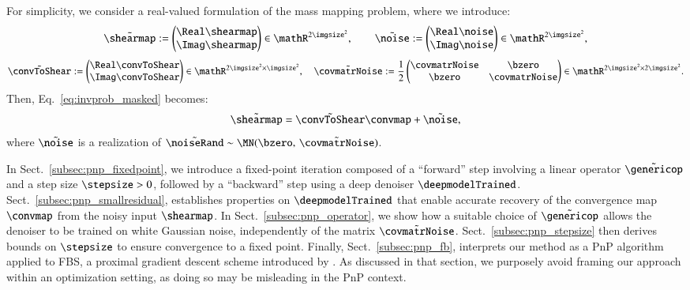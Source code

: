 \documentclass{aa}
\begin{document}
For simplicity, we consider a real-valued formulation of the mass mapping problem, where we introduce:
\begin{equation}
    \tilde\shearmap := \begin{pmatrix}
        \Real\shearmap \\ \Imag\shearmap
    \end{pmatrix} \in \mathR^{2\imgsize^2},
    \qquad
    \tilde\noise := \begin{pmatrix}
        \Real\noise \\ \Imag\noise
    \end{pmatrix} \in \mathR^{2\imgsize^2},
\end{equation}
\begin{equation}
    \tilde\convToShear := \begin{pmatrix}
        \Real\convToShear \\ \Imag\convToShear
    \end{pmatrix} \in \mathR^{2\imgsize^2 \times \imgsize^2},
    \quad
    \tilde\covmatrNoise := \frac12\begin{pmatrix}
        \covmatrNoise & \bzero \\
        \bzero & \covmatrNoise
    \end{pmatrix} \in \mathR^{2\imgsize^2 \times 2\imgsize^2}.
\end{equation}
Then, Eq.~\eqref{eq:invprob_masked} becomes:
\begin{equation}
    \tilde\shearmap = \tilde\convToShear \convmap + \tilde\noise,
\label{eq:invprob_lifted}
\end{equation}
where $\tilde\noise$ is a realization of $\tilde\noiseRand \sim \MN(\bzero,\, \tilde\covmatrNoise)$.

In Sect.~\ref{subsec:pnp_fixedpoint}, we introduce a fixed-point iteration composed of a ``forward'' step involving a linear operator $\tilde\genericop$ and a step size $\stepsize > 0$, followed by a ``backward'' step using a deep denoiser $\deepmodelTrained$. Sect.~\ref{subsec:pnp_smallresidual}, establishes properties on $\deepmodelTrained$ that enable accurate recovery of the convergence map $\convmap$ from the noisy input $\shearmap$. In Sect.~\ref{subsec:pnp_operator}, we show how a suitable choice of $\tilde\genericop$ allows the denoiser to be trained on white Gaussian noise, independently of the matrix $\tilde\covmatrNoise$. Sect.~\ref{subsec:pnp_stepsize} then derives bounds on $\stepsize$ to ensure convergence to a fixed point. Finally, Sect.~\ref{subsec:pnp_fb}, interprets our method as a PnP algorithm \citep{Venkatakrishnan2013} applied to FBS, a proximal gradient descent scheme introduced by \citet{Combettes2005}. As discussed in that section, we purposely avoid framing our approach within an optimization setting, as doing so may be misleading in the PnP context.
\end{document}
